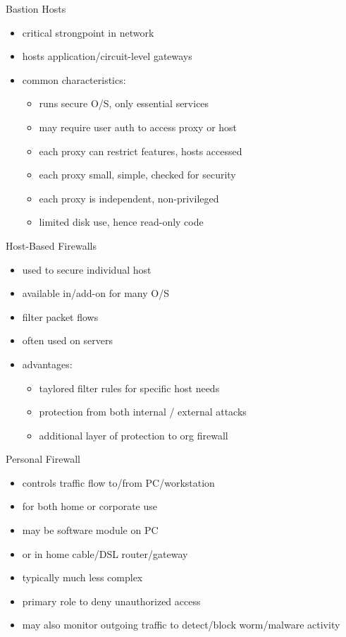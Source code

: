 \documentclass{beamer}
\begin{document}
\begin{frame}{Bastion Hosts}
  \begin{itemize}
  \item critical strongpoint in network 
  \item hosts application/circuit-level gateways 
  \item common characteristics: 
    \begin{itemize}
    \item runs secure O/S, only essential services 
    \item may require user auth to access proxy or host 
    \item each proxy can restrict features, hosts accessed 
    \item each proxy small, simple, checked for security 
    \item each proxy is independent, non-privileged 
    \item limited disk use, hence read-only code 
    \end{itemize}
  \end{itemize}
\end{frame}

\begin{frame}{Host-Based Firewalls}
  \begin{itemize}
  \item used to secure individual host 
  \item available in/add-on for many O/S 
  \item filter packet flows 
  \item often used on servers 
  \item advantages: 
    \begin{itemize}
    \item taylored filter rules for specific host needs 
    \item protection from both internal / external attacks 
    \item additional layer of protection to org firewall 
    \end{itemize}
  \end{itemize}
\end{frame}

\begin{frame}{Personal Firewall}
  \begin{itemize}
  \item controls traffic flow to/from PC/workstation 
  \item for both home or corporate use 
  \item may be software module on PC 
  \item or in home cable/DSL router/gateway 
  \item typically much less complex 
  \item primary role to deny unauthorized access 
  \item may also monitor outgoing traffic to detect/block 
    worm/malware activity
  \end{itemize}
\end{frame}
\end{document}
